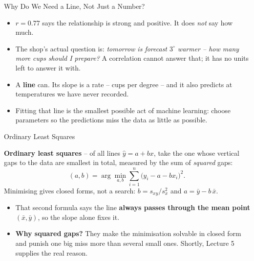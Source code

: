\begin{frame}{Why Do We Need a Line, Not Just a Number?}
\begin{itemize}
  \item $r = 0.77$ says the relationship is strong and positive. It does \emph{not} say how much.
  \pause
  \item The shop's actual question is: \emph{tomorrow is forecast $3^\circ$ warmer -- how many more cups should I prepare?} A correlation cannot answer that; it has no units left to answer it with.
  \pause
  \item A \textbf{line} can. Its slope is a rate -- cups per degree -- and it also predicts at temperatures we have never recorded.
  \pause
  \item Fitting that line is the smallest possible act of machine learning: choose parameters so the predictions miss the data as little as possible.
\end{itemize}
\end{frame}

\begin{frame}{Ordinary Least Squares}
\begin{rldefinition}
\textbf{Ordinary least squares} -- of all lines $\hat{y} = a + bx$, take the one whose vertical gaps to the data are smallest in total, measured by the sum of \emph{squared} gaps:
\[
  (a, b) = \arg\min_{a,b} \sum_{i=1}^{n}\big(y_i - a - b x_i\big)^2 .
\]
Minimising gives closed forms, not a search: $b = s_{xy}/s_x^2$ and $a = \bar{y} - b\,\bar{x}$.
\end{rldefinition}
\pause
\begin{itemize}
  \item That second formula says the line \textbf{always passes through the mean point} $(\bar{x}, \bar{y})$, so the slope alone fixes it.
  \pause
  \item \textbf{Why squared gaps?} They make the minimisation solvable in closed form and punish one big miss more than several small ones. Shortly, Lecture 5 supplies the real reason.
\end{itemize}
\end{frame}

